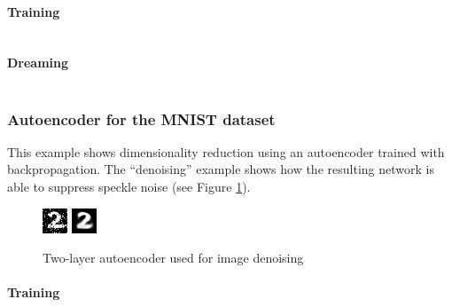 \documentclass[a4paper,twoside,10pt]{article}
\begin{document}
\paragraph{Training}
\inputminted[frame=lines,linenos,fontsize=\small]{python}{mnist-rbm.py}

\paragraph{Dreaming}
\inputminted[frame=lines,linenos,fontsize=\small]{python}{mnist-dream.py}

\subsubsection{Autoencoder for the MNIST dataset}\label{app:auto}
This example shows dimensionality reduction using an autoencoder trained with backpropagation.
The ``denoising'' example shows how the resulting network is able to suppress speckle noise (see Figure \ref{fig:denoise}).
\begin{figure}[htbp]
  \begin{center}
    \includegraphics[width=.3\textwidth]{twonoise}
    \includegraphics[width=.3\textwidth]{twodenoised}
    \caption{Two-layer autoencoder used for image denoising\label{fig:denoise}}
  \end{center}
\end{figure}

\paragraph{Training}
\inputminted[frame=lines,linenos,fontsize=\small]{python}{autoencoder.py}
\end{document}
